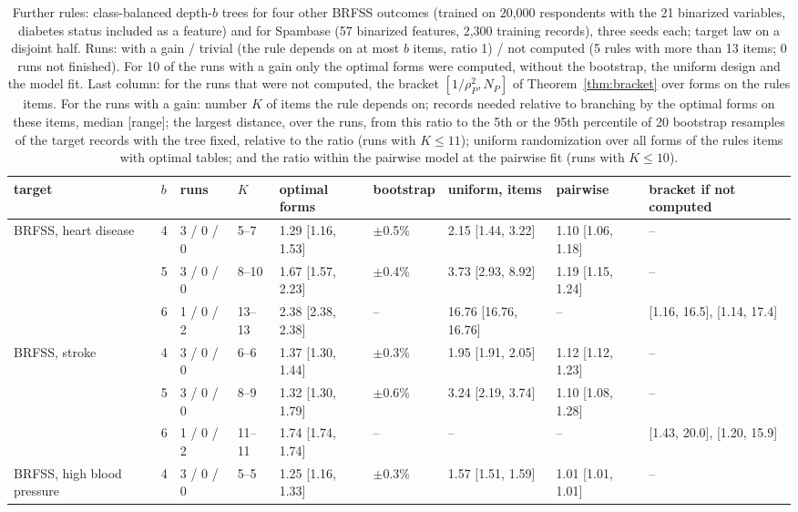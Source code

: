 \begin{table}[h]
\centering
\caption{Further rules: class-balanced depth-$b$ trees for four other BRFSS outcomes (trained on 20,000 respondents with the 21 binarized variables, diabetes status included as a feature) and for Spambase (57 binarized features, 2,300 training records), three seeds each; target law on a disjoint half. Runs: with a gain / trivial (the rule depends on at most $b$ items, ratio 1) / not computed (5 rules with more than 13 items; 0 runs not finished). For 10 of the runs with a gain only the optimal forms were computed, without the bootstrap, the uniform design and the model fit. Last column: for the runs that were not computed, the bracket $[1/\rho_P^2,N_P]$ of Theorem~\ref{thm:bracket} over forms on the rule\textquotesingle s items. For the runs with a gain: number $K$ of items the rule depends on; records needed relative to branching by the optimal forms on these items, median [range]; the largest distance, over the runs, from this ratio to the 5th or the 95th percentile of 20 bootstrap resamples of the target records with the tree fixed, relative to the ratio (runs with $K\le11$); uniform randomization over all forms of the rule\textquotesingle s items with optimal tables; and the ratio within the pairwise model at the pairwise fit (runs with $K\le10$).}
\label{tab:rules}
\scriptsize
\setlength{\tabcolsep}{3pt}
\begin{tabular}{lllllllll}
\toprule
target & $b$ & runs & $K$ & optimal forms & bootstrap & uniform, items & pairwise & bracket if not computed \\
\midrule
BRFSS, heart disease & 4 & 3 / 0 / 0 & 5--7 & 1.29 [1.16, 1.53] & $\pm$0.5\% & 2.15 [1.44, 3.22] & 1.10 [1.06, 1.18] & -- \\
 & 5 & 3 / 0 / 0 & 8--10 & 1.67 [1.57, 2.23] & $\pm$0.4\% & 3.73 [2.93, 8.92] & 1.19 [1.15, 1.24] & -- \\
 & 6 & 1 / 0 / 2 & 13--13 & 2.38 [2.38, 2.38] & -- & 16.76 [16.76, 16.76] & -- & [1.16, 16.5], [1.14, 17.4] \\
BRFSS, stroke & 4 & 3 / 0 / 0 & 6--6 & 1.37 [1.30, 1.44] & $\pm$0.3\% & 1.95 [1.91, 2.05] & 1.12 [1.12, 1.23] & -- \\
 & 5 & 3 / 0 / 0 & 8--9 & 1.32 [1.30, 1.79] & $\pm$0.6\% & 3.24 [2.19, 3.74] & 1.10 [1.08, 1.28] & -- \\
 & 6 & 1 / 0 / 2 & 11--11 & 1.74 [1.74, 1.74] & -- & -- & -- & [1.43, 20.0], [1.20, 15.9] \\
BRFSS, high blood pressure & 4 & 3 / 0 / 0 & 5--5 & 1.25 [1.16, 1.33] & $\pm$0.3\% & 1.57 [1.51, 1.59] & 1.01 [1.01, 1.01] & -- \\

\end{tabular}
\end{table}
